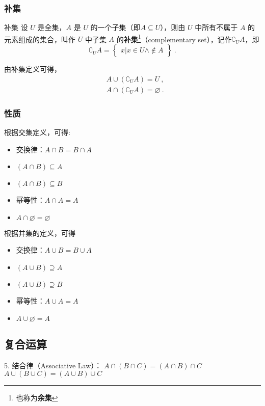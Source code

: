 \subsubsection{补集}
\begin{definition}{补集}
设 $U$ 是全集，$A$ 是 $U$ 的一个子集（即$A\subseteq U$），则由 $U$ 中所有不属于 $A$ 的元素组成的集合，叫作 $U$ 中子集 $A$ 的\textbf{补集}\footnote{也称为\textbf{余集}}（complementary set），记作$\complement_UA$，即
\begin{equation}
\complement_UA = \begin{Bmatrix}x|x\in U \wedge \notin A\end{Bmatrix}~.
\end{equation}
\end{definition}

由补集定义可得，
\begin{equation}
\begin{aligned}
&A\cup (\complement_UA) = U~, \\
&A\cap (\complement_UA) = \varnothing~.
\end{aligned}
\end{equation}

\subsubsection{性质}

根据交集定义，可得:
\begin{itemize}
\item 交换律：$A\cap B = B\cap A$
\item $(A\cap B) \subseteq A$
\item $(A\cap B) \subseteq B$
\item 幂等性：$A\cap A = A$
\item $A\cap \varnothing = \varnothing$
\end{itemize}

根据并集的定义，可得
\begin{itemize}
\item 交换律：$A\cup B = B\cup A$
\item $(A\cup B) \supseteq A$
\item $(A\cup B) \supseteq B$
\item 幂等性：$A\cup A = A$
\item $A\cup \varnothing = A$
\end{itemize}

\subsection{复合运算}
	5.	结合律（Associative Law）：
$ A \cap (B \cap C) = (A \cap B) \cap C$ 
$ A \cup (B \cup C) = (A \cup B) \cup C $

